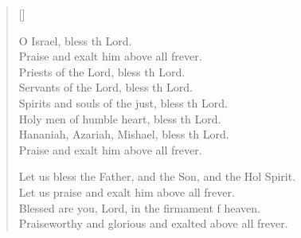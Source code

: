 \begin{verse}[\versewidth]
\begin{patverse}
O Israel, bless th Lord.\Med\\
Praise and exalt him above all frever.\\
Priests of the Lord, bless th Lord.\Med\\
Servants of the Lord, bless th Lord.\\
Spirits and souls of the just, bless th Lord.\Med\\
Holy men of humble heart, bless th Lord.\\
Hananiah, Azariah, Mishael, bless th Lord.\Med\\
Praise and exalt him above all frever.

Let us bless the Father, and the Son, and the Hol Spirit.\Med\\
Let us praise and exalt him above all frever.\\
Blessed are you, Lord, in the firmament f heaven.\Med\\
Praiseworthy and glorious and exalted above all frever.
  \end{patverse}
\end{verse}
